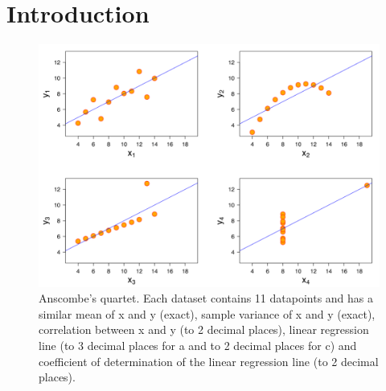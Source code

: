 \documentclass[sigconf]{acmart}
\begin{document}

\maketitle

\let\thefootnote\relax{}

\section{Introduction}

\begin{figure}[htbp]
  \centering
  \includegraphics[width=\linewidth]{./graphics/Anscombe.PNG}
  \caption{Anscombe's quartet. Each dataset contains 11 datapoints and has a similar mean of x and y (exact), sample variance of x and y (exact), correlation between x and y (to 2 decimal places), linear regression line (to 3 decimal places for a and to 2 decimal places for c) and coefficient of 
  determination of the linear regression line (to 2 decimal places)\cite{doi:10.1080/00031305.1973.10478966}.}
  \label{fig:integer:Anscombe}
\end{figure}  
\end{document}
